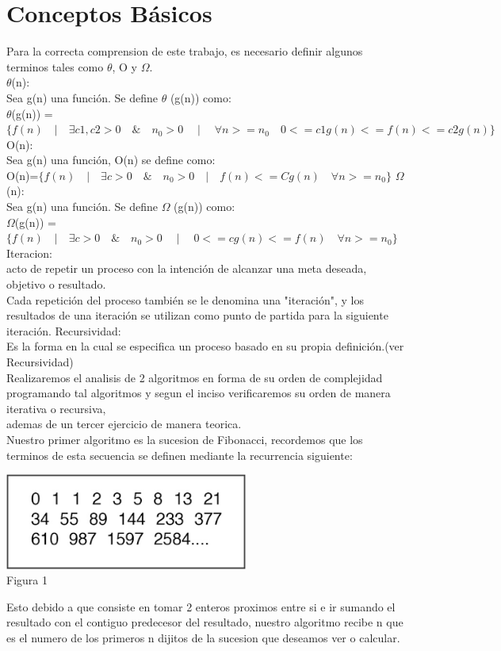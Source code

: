 \documentclass[spanish]{article}
\begin{document}
	\section{Conceptos B\'asicos}
	Para la correcta comprension de este trabajo, es necesario definir algunos terminos tales como $\theta$, O y $\Omega$.\\
	 $\theta$(n):\\
		Sea g(n) una función. Se define  $\theta$ (g(n)) como:\\		
		 	$\theta$(g(n)) = $\{ f(n) \quad | \quad \exists c1,c2>0 \quad \& \quad n_{0}>0 \quad \mid \quad \forall n>=n_{0} \quad 0<= c1g(n) <= f(n) <= c2g(n) \}$
	\bigskip		 			 	
	O(n):\\
		Sea  g(n)  una función, O(n) se define como:\\
			\hspace{1cm}O(n)=$\{f(n) \quad | \quad \exists c >0 \quad \& \quad n_{0}>0 \quad | \quad f(n) <= Cg(n) \quad \forall  n>= n_{0} \}$
	\bigskip	
	$\Omega$(n):\\
	Sea  g(n)  una función. Se define $\Omega$ (g(n)) como:\\
		\hspace{1cm}$\Omega$(g(n)) =$\{f(n) \quad | \quad \exists c >0 \quad \& \quad n_{0}>0 \quad \mid \quad  0<= cg(n)<= f(n) \quad \forall n>= n_{0} \}$\\
	\bigskip
	Iteracion: \\
	acto de repetir un proceso con la intención de alcanzar una meta deseada, objetivo o resultado.\\
	Cada repetición del proceso también se le denomina una "iteración", y los resultados de una iteración se utilizan como punto de partida para la siguiente iteración.
	Recursividad:\\
	Es la forma en la cual se especifica un proceso basado en su propia definición.(ver Recursividad) \\
	\bigskip
	Realizaremos el analisis de 2 algoritmos en forma de su orden de complejidad programando tal algoritmos y segun el inciso verificaremos su orden de manera iterativa o recursiva,\\
	ademas de un tercer ejercicio de manera teorica. \\
	Nuestro primer algoritmo es la sucesion de Fibonacci, recordemos que los terminos de esta secuencia se definen mediante la recurrencia siguiente:	
	\begin{center}
		\includegraphics[width=80mm]{./imagenes/fibo.png}\\
		Figura 1
	\end{center}
	\bigskip
	Esto debido a que consiste en tomar 2 enteros proximos entre si e ir sumando el resultado con el contiguo predecesor del resultado, nuestro algoritmo recibe n que es el numero de los 
	primeros n dijitos de la sucesion que deseamos ver o calcular.
	\bigskip
\end{document}
